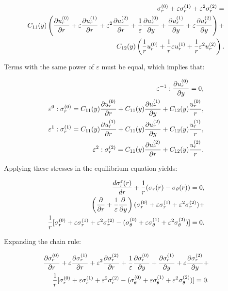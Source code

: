 \begin{equation}
    \begin{aligned} \label{eq:SAFAndHookeInRDirection}
       \StressSAF{r} =\\ C_{11}(y)\left(
             \SAFAfterChainRule{u_r}{r}{y}
        \right) +\\ C_{12}(y)\left(
            \frac{1}{r}u_r^{(0)} + \frac{1}{r}\varepsilon u_r^{(1)} + \frac{1}{r}\varepsilon^2 u_r^{(2)}
        \right).
    \end{aligned}
\end{equation}

Terms with the same power of $\varepsilon$ must be equal, which implies that:

\begin{equation}
    \begin{aligned} \label{eq:HookesLawWithSAFRdirection}
        \varepsilon^{-1}:\partialderivative{u_r^{(0)}}{y} = 0,\\
        \varepsilon^0:\sigma^{(0)}_r = C_{11}(y) \partialderivative{u_r^{(0)}}{r} + C_{11}(y) \partialderivative{u_r^{(1)}}{y} + C_{12}(y)\DeformationTheta, \\
        \varepsilon^1: \sigma^{(1)}_r = C_{11}(y)\partialderivative{u_r^{(1)}}{r} + C_{11}(y)\partialderivative{u_r^{(2)}}{y}+ C_{12}(y)\frac{u_r^{(1)}}{r} , \\
        \varepsilon^2: \sigma^{(2)}_r = C_{11}(y)\partialderivative{u_r^{(2)}}{r} +C_{12}(y) \frac{u_r^{(2)}}{r}.
    \end{aligned}
\end{equation}

Applying these stresses in the equilibrium equation yields:

\begin{equation}
    \begin{aligned}
        \frac{d\sigma_{r}^{\varepsilon}(r)}{dr}+\frac1r( \sigma_r(r)-\sigma_\theta(r))=0,\\
        \left( \ChainRule \right) (\StressSAF{r}) +\\\frac1r [\StressSAF{r} - (\StressSAF{\theta})] = 0.
    \end{aligned}
\end{equation}

Expanding the chain rule:

\begin{equation}
    \begin{aligned}
        \SAFAfterChainRule{\sigma_r}{r}{y} +\\\frac1r [\StressSAF{r} - (\StressSAF{\theta})] = 0.
    \end{aligned}
\end{equation}

